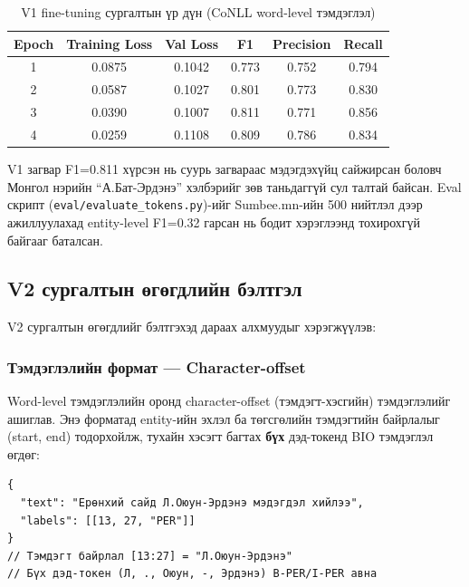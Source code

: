 \begin{table}[h!]
\centering
\renewcommand{\arraystretch}{1.4}
\begin{tabular}{|c|c|c|c|c|c|}
\hline
\textbf{Epoch} & \textbf{Training Loss} & \textbf{Val Loss} & \textbf{F1} & \textbf{Precision} & \textbf{Recall} \\ \hline
1 & 0.0875 & 0.1042 & 0.773 & 0.752 & 0.794 \\ \hline
2 & 0.0587 & 0.1027 & 0.801 & 0.773 & 0.830 \\ \hline
3 & 0.0390 & 0.1007 & 0.811 & 0.771 & 0.856 \\ \hline
4 & 0.0259 & 0.1108 & 0.809 & 0.786 & 0.834 \\ \hline
\end{tabular}
\caption{V1 fine-tuning сургалтын үр дүн (CoNLL word-level тэмдэглэл)}
\label{tab:v1_training}
\end{table}

V1 загвар F1=0.811 хүрсэн нь суурь загвараас мэдэгдэхүйц сайжирсан боловч Монгол нэрийн ``А.Бат-Эрдэнэ'' хэлбэрийг зөв таньдаггүй сул талтай байсан. Eval скрипт (\texttt{eval/evaluate\_tokens.py})-ийг Sumbee.mn-ийн 500 нийтлэл дээр ажиллуулахад entity-level F1=0.32 гарсан нь бодит хэрэглээнд тохирохгүй байгааг баталсан.

\subsection{V2 сургалтын өгөгдлийн бэлтгэл}

V2 сургалтын өгөгдлийг бэлтгэхэд дараах алхмуудыг хэрэгжүүлэв:

\subsubsection{Тэмдэглэлийн формат — Character-offset}

Word-level тэмдэглэлийн оронд character-offset (тэмдэгт-хэсгийн) тэмдэглэлийг ашиглав. Энэ форматад entity-ийн эхлэл ба төгсгөлийн тэмдэгтийн байрлалыг (start, end) тодорхойлж, тухайн хэсэгт багтах \textbf{бүх} дэд-токенд BIO тэмдэглэл өгдөг:

\begin{lstlisting}[caption={Character-offset JSON формат}, basicstyle=\small\ttfamily, breaklines=true, frame=single]
{
  "text": "Ерөнхий сайд Л.Оюун-Эрдэнэ мэдэгдэл хийлээ",
  "labels": [[13, 27, "PER"]]
}
// Тэмдэгт байрлал [13:27] = "Л.Оюун-Эрдэнэ"
// Бүх дэд-токен (Л, ., Оюун, -, Эрдэнэ) B-PER/I-PER авна
\end{lstlisting}

